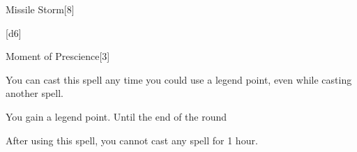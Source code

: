 \begin{spellsection}[Greater]{Missile Storm}[8]
    \begin{spellheader}
    \end{spellheader}
    \begin{spellcontent}
        \begin{spelltargetinginfo}
        \end{spelltargetinginfo}
        \begin{spelleffects}
            \spelleffect {}[d6]
        \end{spelleffects}
    \end{spellcontent}
    \begin{spellfooter}
        \spellnotes \forcespellnotes
        \miscastexplode
    \end{spellfooter}
\end{spellsection}

\begin{spellsection}{Moment of Prescience}[3]
    \begin{spellheader}
    \end{spellheader}
    \begin{spellcontent}
        \begin{spelltargetinginfo}
            \spellspecial You can cast this spell any time you could use a legend point, even while casting another spell.
        \end{spelltargetinginfo}
        \begin{spelleffects}
            \spelleffect You gain a legend point.
            \spelldur Until the end of the round
        \end{spelleffects}
    \end{spellcontent}
    \begin{spellfooter}
        \spellnotes After using this spell, you cannot cast any  spell for 1 hour.
        \miscastexplode
    \end{spellfooter}
\end{spellsection}

